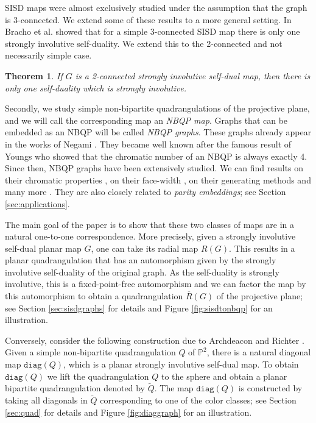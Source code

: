 \documentclass{article}
\newtheorem{theorem}{Theorem}[section]
\newcommand{\Pb}[0]{\mathbb{P}}
\newcommand{\diag}[0]{\mathtt{diag}}
\begin{document}
SISD maps were almost exclusively studied under the assumption that the graph is 3-connected. We extend some of these results to a more general setting. In \cite{bracho2020strongly} Bracho et al. showed that for a simple 3-connected SISD map there is only one strongly involutive self-duality. We extend this to the 2-connected and not necessarily simple case. 

\begin{theorem}\label{thm:onlyonestrong}
If $G$ is a 2-connected strongly involutive self-dual map, then there is only one self-duality which is strongly involutive. 
\end{theorem}


Secondly, we study simple non-bipartite quadrangulations of the projective plane, and we will call the corresponding map an \emph{NBQP map}. Graphs that can be embedded as an NBQP will be called \emph{NBQP graphs}. These graphs already appear in the works of Negami \cite{NE86,NE92}. They became well known after the famous result of Youngs \cite{YOU96} who showed that the chromatic number of an NBQP is always exactly 4. Since then, NBQP graphs have been extensively studied. We can find results on their chromatic properties \cite{mohar2006quadrangulations,nakamoto2004}, on their face-width \cite{esperet2018}, on their generating methods \cite{NEG93} and many more \cite{cairns2008,KAISER20151,MAT16}.  They are also closely related to \emph{parity embeddings}; see Section \ref{sec:applications}. 

The main goal of the paper is to show that these two classes of maps are in a natural one-to-one correspondence.  More precisely,  given a strongly involutive self-dual planar map $G$, one can take its radial map $R(G)$. This results in a planar quadrangulation that has an automorphism given by the strongly involutive self-duality of the original graph. As the self-duality is strongly involutive, this is a fixed-point-free automorphism and we can factor the map by this automorphism to obtain a quadrangulation $\overline R(G)$ of the projective plane; see Section \ref{sec:sisdgraphs} for details and Figure \ref{fig:sisdtonbqp} for an illustration. 

Conversely, consider the following construction due to Archdeacon and Richter \cite{archdeacon1992construction}. Given a simple non-bipartite quadrangulation $Q$ of $\Pb^2$, there is a natural diagonal map $\diag(Q)$, which is a planar strongly involutive self-dual map. To obtain $\diag(Q)$ we lift the quadrangulation $Q$ to the sphere and obtain a planar bipartite quadrangulation denoted by $\widetilde Q$. The map $\diag(Q)$ is constructed by taking all diagonals in $\widetilde Q$ corresponding to one of the color classes; see Section \ref{sec:quad} for details and Figure \ref{fig:diaggraph} for an illustration.
\end{document}

